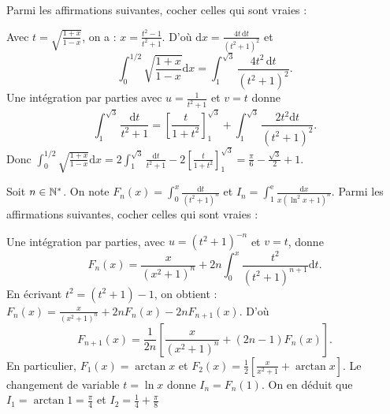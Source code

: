 \begin{question}
Parmi les affirmations suivantes, cocher celles qui sont vraies :
\begin{answers}
\end{answers}
\vskip2mm
\begin{explanations}
Avec $\displaystyle t=\sqrt{\frac{1+x}{1-x}}$, on a : $\displaystyle x=\frac{t^2-1}{t^2+1}$. D'où $\displaystyle \mathrm{d}x=\frac{4t\, \mathrm{d}t}{(t^2+1)^2}$ et 
$$\int _0^{1/2}\sqrt{\frac{1+x}{1-x}}\mathrm{d}x=\int _1^{\sqrt{3}}\frac{4t^2\, \mathrm{d}t}{(t^2+1)^2}.$$
Une intégration par parties avec $\displaystyle u=\frac{1}{t^2+1}$ et $v=t$ donne
$$\int _1^{\sqrt{3}}\frac{\mathrm{d}t}{t^2+1}=\left[\frac{t}{1+t^2}\right]_1^{\sqrt{3}}+\int _1^{\sqrt{3}}\frac{2t^2\mathrm{d}t}{(t^2+1)^2}.$$
Donc $\displaystyle \int _0^{1/2}\sqrt{\frac{1+x}{1-x}}\mathrm{d}x=2\int _1^{\sqrt{3}}\frac{\mathrm{d}t}{t^2+1}-2\left[\frac{t}{1+t^2}\right]_1^{\sqrt{3}}=\frac{\pi}{6}-\frac{\sqrt{3}}{2}+1$.
\end{explanations}
\end{question}

\begin{question}
Soit $n\in \mathbb{N}^*$. On note $\displaystyle F_n(x)=\int _0^x\frac{\mathrm{d}t}{(t^2+1)^n}$ et $\displaystyle I_n=\int _1^{\mathrm{e}}\frac{\mathrm{d}x}{x\left(\ln ^2x+1\right)^n}$. Parmi les affirmations suivantes, cocher celles qui sont vraies :
\begin{answers}  
\end{answers}
\vskip2mm
\begin{explanations}
Une intégration par parties, avec $\displaystyle u=(t^2+1)^{-n}$ et $v=t$, donne
$$F_n(x)=\frac{x}{(x^2+1)^n}+2n\int _0^x \frac{t^2}{(t^2+1)^{n+1}}\mathrm{d}t.$$
En écrivant $t^2=(t^2+1)-1$, on obtient : $\displaystyle F_n(x)=\frac{x}{(x^2+1)^n}+2nF_n(x)-2nF_{n+1}(x)$. D'où
$$F_{n+1}(x)=\frac{1}{2n}\left[\frac{x}{(x^2+1)^n}+(2n-1)F_n(x)\right].$$
En particulier, $F_1(x)=\arctan x$ et $\displaystyle F_2(x)=\frac{1}{2}\left[\frac{x}{x^2+1}+\arctan x\right]$. Le changement de variable $t=\ln x$ donne $I_n=F_n(1)$. On en déduit que $\displaystyle I_1=\arctan 1=\frac{\pi}{4}$ et $\displaystyle I_2=\frac{1}{4}+\frac{\pi}{8}$
\end{explanations}
\end{question}
